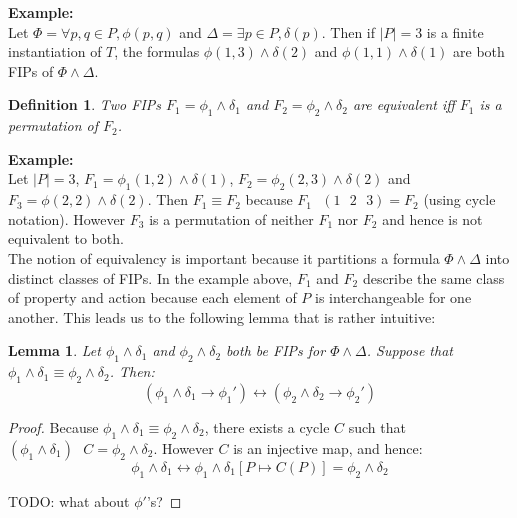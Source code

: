 \documentclass[12pt]{article}
\newtheorem{lemma}{Lemma}
\newtheorem{definition}{Definition}
\newcommand{\msp}{\text{ }}
\begin{document}
\noindent \textbf{Example:}\\
Let $\Phi = \forall p,q \in P, \phi(p,q)$ and $\Delta = \exists p \in P, \delta(p)$.  Then if $|P|=3$ is a finite instantiation of $T$, the formulas $\phi(1,3) \land \delta(2)$ and $\phi(1,1) \land \delta(1)$ are both FIPs of $\Phi \land \Delta$.

\begin{definition}
  Two FIPs $F_1 = \phi_1 \land \delta_1$ and $F_2 = \phi_2 \land \delta_2$ are equivalent iff $F_1$ is a permutation of $F_2$.
\end{definition}

\noindent \textbf{Example:}\\
Let $|P|=3$, $F_1 = \phi_1(1,2) \land \delta(1)$, $F_2 = \phi_2(2,3) \land \delta(2)$ and $F_3 = \phi(2,2) \land \delta(2)$.  Then $F_1 \equiv F_2$ because $F_1 \msp (1 \msp 2 \msp 3) = F_2$ (using cycle notation).  However $F_3$ is a permutation of neither $F_1$ nor $F_2$ and hence is not equivalent to both.\\

The notion of equivalency is important because it partitions a formula $\Phi \land \Delta$ into distinct classes of FIPs.  In the example above, $F_1$ and $F_2$ describe the same class of property and action because each element of $P$ is interchangeable for one another.  This leads us to the following lemma that is rather intuitive:

\begin{lemma}
  Let $\phi_1\land\delta_1$ and $\phi_2\land\delta_2$ both be FIPs for $\Phi\land\Delta$.  Suppose that $\phi_1\land\delta_1 \equiv \phi_2\land\delta_2$.  Then:
  $$(\phi_1 \land \delta_1 \rightarrow \phi_1') \leftrightarrow (\phi_2 \land \delta_2 \rightarrow \phi_2')$$
\end{lemma}
\begin{proof}
  Because $\phi_1\land\delta_1 \equiv \phi_2\land\delta_2$, there exists a cycle $C$ such that $(\phi_1\land\delta_1) \msp C = \phi_2\land\delta_2$.  However $C$ is an injective map, and hence:
  $$\phi_1\land\delta_1 \leftrightarrow \phi_1\land\delta_1[P \mapsto C(P)] = \phi_2\land\delta_2$$

  TODO: what about $\phi'$'s?

\end{proof}
\end{document}

